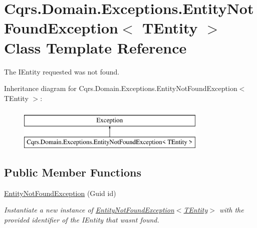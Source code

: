 \hypertarget{classCqrs_1_1Domain_1_1Exceptions_1_1EntityNotFoundException}{}\section{Cqrs.\+Domain.\+Exceptions.\+Entity\+Not\+Found\+Exception$<$ T\+Entity $>$ Class Template Reference}
\label{classCqrs_1_1Domain_1_1Exceptions_1_1EntityNotFoundException}


The I\+Entity requested was not found.  


Inheritance diagram for Cqrs.\+Domain.\+Exceptions.\+Entity\+Not\+Found\+Exception$<$ T\+Entity $>$\+:\begin{figure}[H]
\begin{center}
\leavevmode
\includegraphics[height=2.000000cm]{classCqrs_1_1Domain_1_1Exceptions_1_1EntityNotFoundException}
\end{center}
\end{figure}
\subsection*{Public Member Functions}
\begin{DoxyCompactItemize}
\item 
\hyperlink{classCqrs_1_1Domain_1_1Exceptions_1_1EntityNotFoundException_ab62ed57aa319b92b5aebe6b34c69b177_ab62ed57aa319b92b5aebe6b34c69b177}{Entity\+Not\+Found\+Exception} (Guid id)
\begin{DoxyCompactList}\small\item\em Instantiate a new instance of \hyperlink{classCqrs_1_1Domain_1_1Exceptions_1_1EntityNotFoundException_ab62ed57aa319b92b5aebe6b34c69b177_ab62ed57aa319b92b5aebe6b34c69b177}{Entity\+Not\+Found\+Exception$<$\+T\+Entity$>$} with the provided identifier of the I\+Entity that wasn\textquotesingle{}t found. \end{DoxyCompactList}\end{DoxyCompactItemize}

